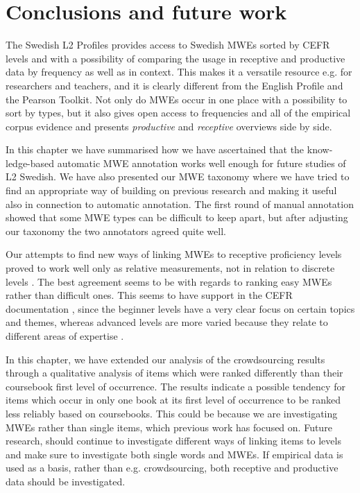\documentclass[output=paper,colorlinks,citecolor=brown]{langscibook}
\begin{document}
\section{Conclusions and future work}\label{sec:Disc}

The Swedish L2 Profiles provides access to Swedish MWEs sorted by CEFR levels and with a possibility of comparing the usage in receptive and productive data by frequency as well as in context. This makes it a versatile resource e.g. for researchers and teachers, and it is clearly different from the English Profile and the Pearson Toolkit. Not only do MWEs occur in one place with a possibility to sort by types, but it also gives open access to frequencies and all of the empirical corpus evidence and presents \textit{productive} and \textit{receptive} overviews side by side. 

In this chapter we have summarised how 
we have ascertained that the know-ledge-based automatic MWE annotation works well enough for future studies of L2 Swedish. 
We have also presented our MWE taxonomy where we have tried to find an appropriate way of building on previous research and making it useful also in connection to automatic annotation.
The first round of manual annotation showed that some MWE types can be difficult to keep apart, but after adjusting our taxonomy the two annotators agreed quite well. 

Our attempts to find new ways of linking MWEs to receptive proficiency levels proved to work well only as relative measurements, not in relation to discrete levels \citep[][]{alfter2021mwe}. The best agreement seems to be with regards to ranking easy MWEs rather than difficult ones. This seems to have support in the CEFR documentation \citep{council2001common}, since the beginner levels have a very clear focus on certain topics and themes, whereas advanced levels are more varied because they relate to different areas of expertise \citep[cf.][]{lindstrom2022MWE}{}{}. 

In this chapter, we have extended our analysis of the crowdsourcing results through a qualitative analysis of items which were ranked differently than their coursebook first level of occurrence. 
The results indicate a possible tendency for items which occur in only one book at its first level of occurrence to be ranked less reliably based on coursebooks. This could be because we are investigating MWEs rather than single items, which previous work has focused on. Future research, should continue to investigate different ways of linking items to levels and make sure to investigate both single words and MWEs. If empirical data is used as a basis, rather than e.g. crowdsourcing, both receptive and productive data should be investigated.
\end{document}
